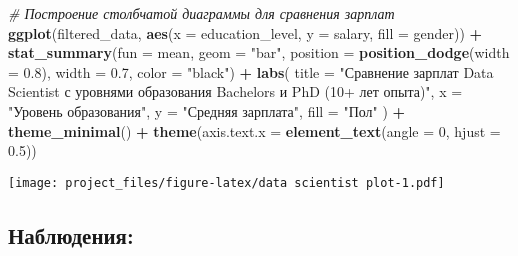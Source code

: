 \documentclass[
]{article}
\newenvironment{Shaded}{\begin{snugshade}}{\end{snugshade}}
\newcommand{\AttributeTok}[1]{\textcolor[rgb]{0.13,0.29,0.53}{#1}}
\newcommand{\CommentTok}[1]{\textcolor[rgb]{0.56,0.35,0.01}{\textit{#1}}}
\newcommand{\DecValTok}[1]{\textcolor[rgb]{0.00,0.00,0.81}{#1}}
\newcommand{\FloatTok}[1]{\textcolor[rgb]{0.00,0.00,0.81}{#1}}
\newcommand{\FunctionTok}[1]{\textcolor[rgb]{0.13,0.29,0.53}{\textbf{#1}}}
\newcommand{\NormalTok}[1]{#1}
\newcommand{\SpecialCharTok}[1]{\textcolor[rgb]{0.81,0.36,0.00}{\textbf{#1}}}
\newcommand{\StringTok}[1]{\textcolor[rgb]{0.31,0.60,0.02}{#1}}
\begin{document}
\begin{Shaded}
\begin{Highlighting}[]
\CommentTok{\# Построение столбчатой диаграммы для сравнения зарплат}
\FunctionTok{ggplot}\NormalTok{(filtered\_data, }\FunctionTok{aes}\NormalTok{(}\AttributeTok{x =}\NormalTok{ education\_level, }\AttributeTok{y =}\NormalTok{ salary, }\AttributeTok{fill =}\NormalTok{ gender)) }\SpecialCharTok{+}
  \FunctionTok{stat\_summary}\NormalTok{(}\AttributeTok{fun =}\NormalTok{ mean, }\AttributeTok{geom =} \StringTok{"bar"}\NormalTok{, }\AttributeTok{position =} \FunctionTok{position\_dodge}\NormalTok{(}\AttributeTok{width =} \FloatTok{0.8}\NormalTok{), }\AttributeTok{width =} \FloatTok{0.7}\NormalTok{, }\AttributeTok{color =} \StringTok{"black"}\NormalTok{) }\SpecialCharTok{+}
  \FunctionTok{labs}\NormalTok{(}
    \AttributeTok{title =} \StringTok{"Сравнение зарплат Data Scientist с уровнями образования Bachelor\textquotesingle{}s и PhD (10+ лет опыта)"}\NormalTok{,}
    \AttributeTok{x =} \StringTok{"Уровень образования"}\NormalTok{,}
    \AttributeTok{y =} \StringTok{"Средняя зарплата"}\NormalTok{,}
    \AttributeTok{fill =} \StringTok{"Пол"}
\NormalTok{  ) }\SpecialCharTok{+}
  \FunctionTok{theme\_minimal}\NormalTok{() }\SpecialCharTok{+}
  \FunctionTok{theme}\NormalTok{(}\AttributeTok{axis.text.x =} \FunctionTok{element\_text}\NormalTok{(}\AttributeTok{angle =} \DecValTok{0}\NormalTok{, }\AttributeTok{hjust =} \FloatTok{0.5}\NormalTok{))}
\end{Highlighting}
\end{Shaded}

\texttt{[image: project\_files/figure-latex/data scientist plot-1.pdf]}

\subsection{Наблюдения:}\label{ux43dux430ux431ux43bux44eux434ux435ux43dux438ux44f-16}
\end{document}
